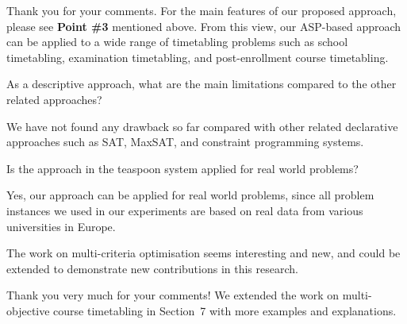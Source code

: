 \documentclass[a4j]{article}
\begin{document}
Thank you for your comments.
For the main features of our proposed approach,
please see \textbf{Point \#3} mentioned above.
From this view, 
our ASP-based approach can be applied to a wide range of timetabling
problems such as school timetabling, examination timetabling, and
post-enrollment course timetabling.

\begin{it}\color{blue}
As a descriptive approach, what are the main limitations compared to
the other related approaches? 
\end{it}

We have not found any drawback so far compared with other related
declarative approaches such as SAT, MaxSAT, and constraint programming
systems.

\begin{it}\color{blue}
Is the approach in the teaspoon system
applied for real world problems?
\end{it}

Yes, our approach can be applied for real world problems, since 
all problem instances we used in our experiments are
based on real data from various universities in Europe.

\begin{it}\color{blue}
The work on multi-criteria optimisation seems interesting and new, and
could be extended to demonstrate new contributions in this research.
\end{it}

Thank you very much for your comments!
We extended the work on multi-objective course timetabling in
Section~7 with more examples and explanations.


\end{document}
